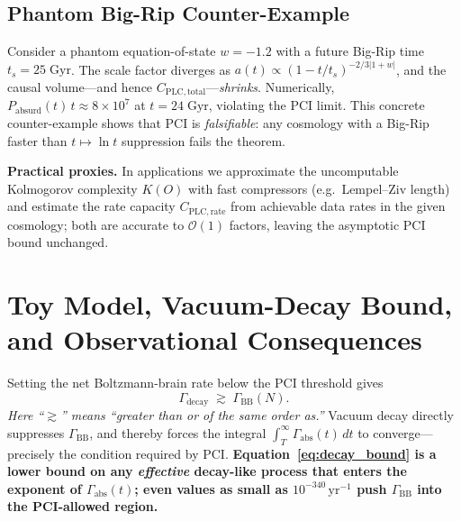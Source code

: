 \documentclass[12pt]{article}
\newcommand{\PCI}{PCI\xspace}
\begin{document}
\subsection*{Phantom Big-Rip Counter-Example}
Consider a phantom equation-of-state $w=-1.2$ with a future
Big-Rip time $t_s=25\;\mathrm{Gyr}$.  The scale factor diverges as
$a(t)\propto(1-t/t_s)^{-2/3|1+w|}$, and the causal volume—and hence
$C_{\mathrm{PLC,total}}$—\emph{shrinks}.  Numerically,
$P_{\text{absurd}}(t)\,t\approx 8\times10^{7}$ at $t=24\;\mathrm{Gyr}$,
violating the \PCI limit.  This concrete counter-example shows that \PCI
is \emph{falsifiable}: any cosmology with a Big-Rip faster than
$t\mapsto\ln t$ suppression fails the theorem.

\medskip\noindent
\textbf{Practical proxies.}  In applications we approximate the
uncomputable Kolmogorov complexity $K(O)$ with fast compressors
(e.g.\ Lempel–Ziv length) and estimate the rate capacity
$C_{\mathrm{PLC,rate}}$ from achievable data rates in the given
cosmology; both are accurate to $\mathcal O(1)$ factors, leaving the
asymptotic \PCI bound unchanged.

\section{Toy Model, Vacuum-Decay Bound, and Observational Consequences}\label{sec:toy}
Setting the net Boltzmann-brain rate below the \PCI threshold gives
\begin{equation}
\Gamma_{\text{decay}}\;\gtrsim\;\Gamma_{\text{BB}}(N).
  \label{eq:decay_bound}
\end{equation}
\noindent
\textit{Here “$\gtrsim$” means “greater than or of the same order as.”}
Vacuum decay directly suppresses $\Gamma_{\text{BB}}$, and thereby
forces the integral $\int_T^\infty\Gamma_{\text{abs}}(t)\,dt$ to
converge—precisely the condition required by \PCI.  
\textbf{Equation~\eqref{eq:decay_bound} is a lower bound on any
\emph{effective} decay-like process that enters the exponent of
$\Gamma_{\text{abs}}(t)$; even values as small as
$10^{-340}\,\mathrm{yr^{-1}}$ push $\Gamma_{\text{BB}}$ into the
\PCI-allowed region.}
\end{document}
